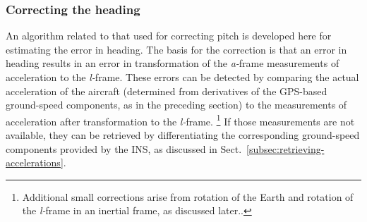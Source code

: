 \documentclass[12pt,twoside,english,12pt,twoside,english]{article}\usepackage[]{graphicx}\usepackage[]{color}
\let\OrgIndex\index
\renewcommand*{\index}[1]{\OrgIndex{#1}}
\begin{document}
\subsubsection{Correcting the heading\label{subsec:CorrectHeading}}

An algorithm related to that
used for correcting pitch is developed here for estimating the error
in heading. The basis for the correction is that an error in heading
results in an error in transformation of the \emph{a-}frame measurements
of acceleration
to the \emph{l-}frame.
These errors can be detected by comparing
the actual acceleration of the aircraft
(determined from derivatives of the
GPS-based ground-speed
components, as in the preceding section) to the measurements of acceleration
after transformation to the \emph{l-}frame. \footnote{Additional small corrections arise from rotation of the Earth
and rotation of the \emph{l-}frame
in an inertial frame, as discussed
later..} If those measurements
are not available, they can be retrieved
by differentiating the corresponding ground-speed components provided
by the INS, as discussed in Sect.~\ref{subsec:retrieving-accelerations}. 
\end{document}
